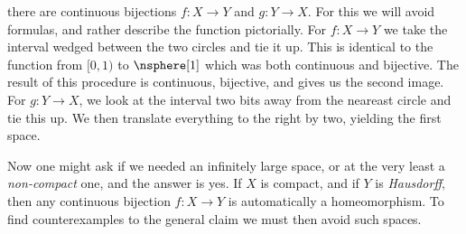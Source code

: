 \documentclass{book}                                                           %
\begin{document}
                there are continuous bijections $f:X\rightarrow{Y}$ and
                $g:Y\rightarrow{X}$. For this we will avoid formulas, and rather
                describe the function pictorially. For $f:X\rightarrow{Y}$ we
                take the interval wedged between the two circles and tie it up.
                This is identical to the function from $[0,1)$ to $\nsphere[1]$
                which was both continuous and bijective. The result of this
                procedure is continuous, bijective, and gives us the second
                image. For $g:Y\rightarrow{X}$, we look at the interval two bits
                away from the neareast circle and tie this up. We then translate
                everything to the right by two, yielding the first space.
                \par\hfill\par
                Now one might ask if we needed an infinitely large space, or at
                the very least a \textit{non-compact} one, and the answer is
                yes. If $X$ is compact, and if $Y$ is \textit{Hausdorff}, then
                any continuous bijection $f:X\rightarrow{Y}$ is automatically a
                homeomorphism. To find counterexamples to the general claim we
                must then avoid such spaces.
\end{document}

